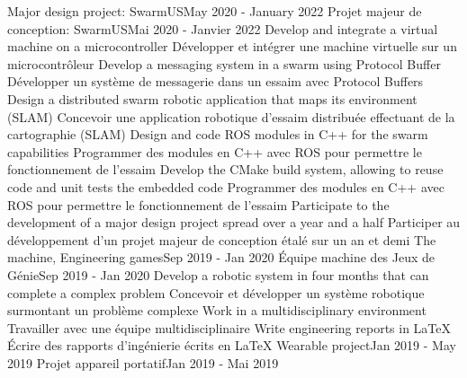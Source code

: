     \resumeSubHeadingListStart
      \resumeProjectHeadingEnFr
          {Major design project: SwarmUS}{May 2020 - January 2022}
          {Projet majeur de conception: SwarmUS}{Mai 2020 - Janvier 2022}
            \resumeItemListStart
                \resumeItemEnFr
                    {Develop and integrate a virtual machine on a microcontroller}
                    {Développer et intégrer une machine virtuelle sur un microcontrôleur}
                \resumeItemEnFr
                    {Develop a messaging system in a swarm using Protocol Buffer}
                    {Développer un système de messagerie dans un essaim avec Protocol Buffers}
                \resumeItemEnFr
                    {Design a distributed swarm robotic application that maps its environment (SLAM)}
                    {Concevoir une application robotique d’essaim distribuée effectuant de la cartographie (SLAM)}
                \resumeItemEnFr
                    {Design and code ROS modules in C++ for the swarm capabilities}
                    {Programmer des modules en C++ avec ROS pour permettre le fonctionnement de l’essaim}
                \resumeItemEnFr
                    {Develop the CMake build system, allowing to reuse code and unit tests the embedded code}
                    {Programmer des modules en C++ avec ROS pour permettre le fonctionnement de l’essaim}
                \resumeItemEnFr
                    {Participate to the development of a major design project spread over a year and a half}
                    {Participer au développement d’un projet majeur de conception étalé sur un an et demi}
            \resumeItemListEnd
      \resumeProjectHeadingEnFr
          {The machine, Engineering games}{Sep 2019 - Jan 2020}
          {Équipe machine des Jeux de Génie}{Sep 2019 - Jan 2020}
            \resumeItemListStart
                \resumeItemEnFr
                    {Develop a robotic system in four months that can complete a complex problem}
                    {Concevoir et développer un système robotique surmontant un problème complexe}
                \resumeItemEnFr
                    {Work in a multidisciplinary environment}
                    {Travailler avec une équipe multidisciplinaire}
                \resumeItemEnFr
                    {Write engineering reports in LaTeX}
                    {Écrire des rapports d’ingénierie écrits en LaTeX}
            \resumeItemListEnd
      \resumeProjectHeadingEnFr
          {Wearable project}{Jan 2019 - May 2019}
          {Projet appareil portatif}{Jan 2019 - Mai 2019}
